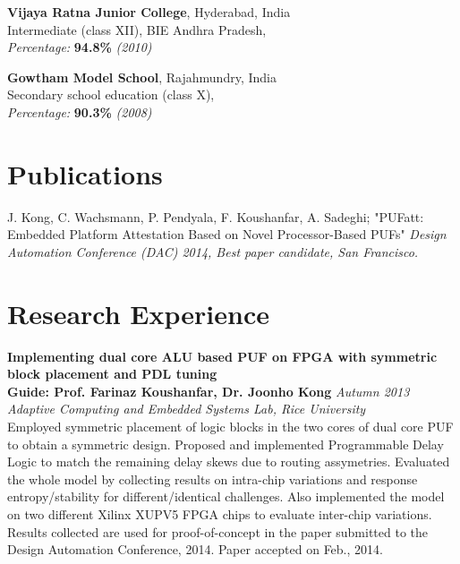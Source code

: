 \documentclass[margin,line]{resume}
\begin{document}
\begin{resume}
        {\bf Vijaya Ratna Junior College}, Hyderabad, India\\
		Intermediate (class XII), BIE Andhra Pradesh,\\
        \textit{\hspace*{2mm}Percentage:} \textbf{94.8\%} \textit{(2010)}
        \vspace{-2mm}
        
        {\bf Gowtham Model School}, Rajahmundry, India\\
		Secondary school education (class X),\\
        \textit{\hspace*{2mm}Percentage:} \textbf{90.3\%} \textit{(2008)}
        
\section{\mysidestyle Publications}
	J. Kong, C. Wachsmann, P. Pendyala, F. Koushanfar, A. Sadeghi; "PUFatt: Embedded Platform Attestation Based on Novel Processor-Based PUFs"	\hfill {\textit{Design Automation Conference (DAC) 2014, Best paper candidate, San Francisco.}}\\
	\vspace{-2mm}
	
			
\section{\mysidestyle Research Experience}
	
    {\bf Implementing dual core ALU based PUF on FPGA with symmetric block placement and PDL tuning} \\
    {\bf Guide: Prof. Farinaz Koushanfar, Dr. Joonho Kong} \hfill \textit{Autumn 2013} \\
    {\it Adaptive Computing and Embedded Systems Lab, Rice University} \\
	Employed symmetric placement of logic blocks in the two cores of dual core PUF to obtain a symmetric design. Proposed and implemented Programmable Delay Logic to match the remaining delay skews due to routing assymetries. Evaluated the whole model by collecting results on intra-chip variations and response entropy/stability for different/identical challenges. Also implemented the model on two different Xilinx XUPV5 FPGA chips to evaluate inter-chip variations. Results collected are used for proof-of-concept in the paper submitted to the Design Automation Conference, 2014. Paper accepted on Feb., 2014.
	

\end{resume}
\end{document}
